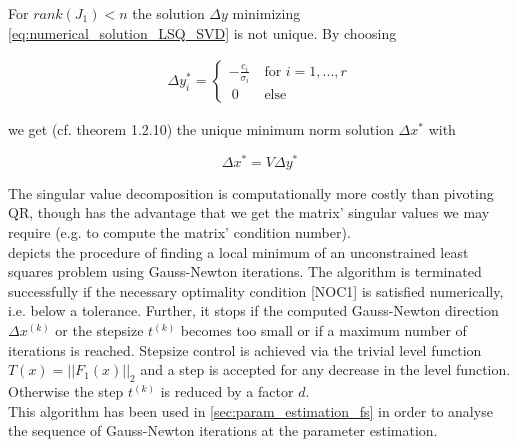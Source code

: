 \documentclass{scrartcl}[12pt, halfparskip]
\numberwithin{equation}{section}
\numberwithin{figure}{section}
\numberwithin{table}{section}
\begin{document}
\begin{itemize}
	For $rank(J_1) < n$ the solution $\Delta y$ minimizing \cref{eq:numerical_solution_LSQ_SVD} is not unique. By choosing
	
	\begin{align}
		\Delta y_i^* = 
		\begin{cases}
			- \frac{c_i}{\sigma_i} \ & \text{for } i=1,...,r \\
			\ 0 \ & \text{else}
		\end{cases}
	\end{align}
	
	we get (cf. \cite{numerical_methods_lsq_Bjorck} theorem 1.2.10) the unique minimum norm solution  $\Delta x^*$ with
	
	\begin{equation}
		\Delta x^* = V \Delta y^*
	\end{equation}

\end{itemize}

The singular value decomposition is computationally more costly than pivoting QR, though has the advantage that we get the matrix' singular values we may require (e.g. to compute the matrix' condition number). \\

 depicts the procedure of finding a local minimum of an unconstrained least squares problem using Gauss-Newton iterations. The algorithm is terminated successfully if the necessary optimality condition [NOC1] is satisfied numerically, i.e. below a tolerance. Further, it stops if the computed Gauss-Newton direction $\Delta x^{(k)}$ or the stepsize $t^{(k)}$ becomes too small or if a maximum number of iterations is reached. Stepsize control is achieved via the trivial level function $T(x) = ||F_1(x)||_2$ and a step is accepted for any decrease in the level function. Otherwise the step $t^{(k)}$ is reduced by a factor $d$. \\
This algorithm has been used in \cref{sec:param_estimation_fs} in order to analyse the sequence of Gauss-Newton iterations at the parameter estimation.  \\
\end{document}
